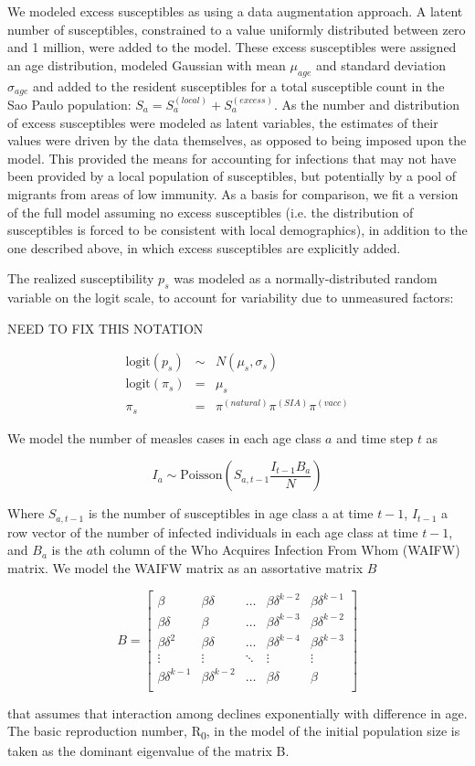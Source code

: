 We modeled excess susceptibles as using a data augmentation approach. A latent number of susceptibles, constrained to a value uniformly distributed between zero and 1 million, were added to the model. These excess susceptibles were assigned an age distribution, modeled Gaussian with mean \(\mu_{age}\) and standard deviation \(\sigma_{age}\) and added to the resident susceptibles for a total susceptible count in the Sao Paulo population: \(S_a = S_a^{(local)} + S_a^{(excess)}\). As the number and distribution of excess susceptibles were modeled as latent variables, the estimates of their values were driven by the data themselves, as opposed to being imposed upon the model. This provided the means for accounting for infections that may not have been provided by a local population of susceptibles, but potentially by a pool of migrants from areas of low immunity. As a basis for comparison, we fit a version of the full model assuming no excess susceptibles (i.e. the distribution of susceptibles is forced to be consistent with local demographics), in addition to the one described above, in which excess susceptibles are explicitly added.

The realized susceptibility \(p_s\) was modeled as a normally-distributed random variable on the logit scale, to account for variability due to unmeasured factors:

NEED TO FIX THIS NOTATION

\begin{eqnarray}
\text{logit}(p_s) &\sim& N(\mu_s, \sigma_s) \\
\text{logit}(\pi_s) &=& \mu_s \\
\pi_s &=& \pi^{(natural)} \pi^{(SIA)} \pi^{(vacc)}
\end{eqnarray}


We model the number of measles cases in each age class \(a\) and time step \(t\) as 

\[I_a \sim \text{Poisson}\left(S_{a,t-1} \frac{I_{t-1}B_a}{N} \right)\] 

Where \(S_{a,t-1}\) is the number of susceptibles in age class a at time \(t-1\), \(I_{t-1}\) a row vector of the number of infected individuals in each age class at time \(t-1\), and \(B_a\) is the \(a\)th column of the Who Acquires Infection From Whom (WAIFW) matrix.  We model the WAIFW matrix as an assortative matrix \(B\)

\[B = \left[{
\begin{array}{c}
  {\beta} & {\beta \delta} & \ldots & {\beta \delta^{k-2}} & {\beta \delta^{k-1}}  \\
  {\beta \delta} & {\beta} & \ldots & {\beta \delta^{k-3}} & {\beta \delta^{k-2}} \\
{\beta \delta^2} & {\beta \delta} & \ldots & {\beta \delta^{k-4}} & {\beta \delta^{k-3}}  \\
  \vdots & \vdots & \ddots & \vdots & \vdots \\
  {\beta \delta^{k-1}} & {\beta \delta^{k-2}} & \ldots & {\beta \delta} & {\beta}  \\
\end{array}
}\right]\]

that assumes that interaction among declines exponentially with
difference in age. The basic reproduction number, R\textsubscript{0}, in
the model of the initial population size is taken as the dominant
eigenvalue of the matrix B.
